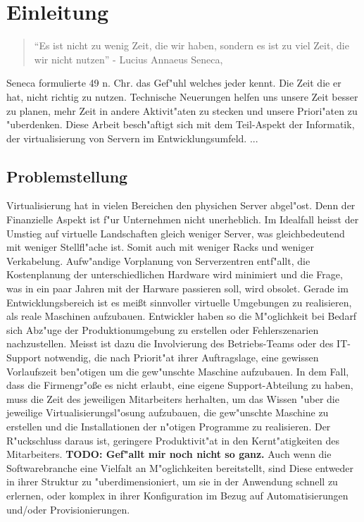 \chapter{Einleitung}

\begin{quote}
	``Es ist nicht zu wenig Zeit, die wir haben, sondern es ist zu viel Zeit, die wir nicht nutzen'' - Lucius Annaeus Seneca, \cite{Apelt200511}
\end{quote}
Seneca formulierte  49 n. Chr. das Gef"uhl welches jeder kennt. Die Zeit die er hat, nicht richtig zu nutzen.
Technische Neuerungen helfen uns unsere Zeit besser zu planen, mehr Zeit in andere Aktivit"aten zu stecken und unsere Priori"aten zu "uberdenken.
Diese Arbeit besch"aftigt sich mit dem Teil-Aspekt der Informatik, der virtualisierung von Servern im Entwicklungsumfeld.\newline
...

\section{Problemstellung}
Virtualisierung hat in vielen Bereichen den physichen Server abgel"ost. \newline
Denn der Finanzielle Aspekt ist f"ur Unternehmen nicht unerheblich. Im Idealfall heisst der Umstieg auf virtuelle Landschaften gleich weniger Server, was gleichbedeutend mit weniger Stellfl"ache ist. Somit auch mit weniger Racks und weniger Verkabelung.\newline
Aufw"andige Vorplanung von Serverzentren entf"allt, die Kostenplanung der unterschiedlichen Hardware wird minimiert und die Frage, was in ein paar Jahren mit der Harware passieren soll, wird obsolet.\newline
Gerade im Entwicklungsbereich ist es mei{\ss}t sinnvoller virtuelle Umgebungen zu realisieren, als reale Maschinen aufzubauen. Entwickler haben so die M"oglichkeit bei Bedarf sich Abz"uge der Produktionumgebung zu erstellen oder Fehlerszenarien nachzustellen.\newline
Meisst ist dazu die Involvierung des Betriebs-Teams oder des IT-Support notwendig, die nach Priorit"at ihrer Auftragslage, eine gewissen Vorlaufszeit ben"otigen um die gew"unschte Maschine aufzubauen. \newline
In dem Fall, dass die Firmengr"o{\ss}e es nicht erlaubt, eine eigene Support-Abteilung zu haben, muss die Zeit des jeweiligen Mitarbeiters herhalten, um das Wissen "uber die jeweilige Virtualisierungsl"osung aufzubauen, die gew"unschte Maschine zu erstellen und die Installationen der n"otigen Programme zu realisieren. Der R"uckschluss daraus ist, geringere Produktivit"at in den Kernt"atigkeiten des Mitarbeiters. \textbf{TODO: Gef"allt mir noch nicht so ganz.}\newline
Auch wenn die Softwarebranche eine Vielfalt an M"oglichkeiten bereitstellt, sind Diese entweder in ihrer Struktur zu "uberdimensioniert, um sie in der Anwendung schnell zu erlernen, oder komplex in ihrer Konfiguration im Bezug auf Automatisierungen und/oder Provisionierungen.

